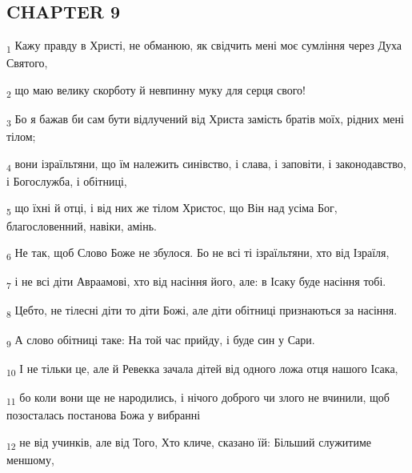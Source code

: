 \subsection{CHAPTER 9}
\begin{tcolorbox}
\textsubscript{1} Кажу правду в Христі, не обманюю, як свідчить мені моє сумління через Духа Святого,
\end{tcolorbox}
\begin{tcolorbox}
\textsubscript{2} що маю велику скорботу й невпинну муку для серця свого!
\end{tcolorbox}
\begin{tcolorbox}
\textsubscript{3} Бо я бажав би сам бути відлучений від Христа замість братів моїх, рідних мені тілом;
\end{tcolorbox}
\begin{tcolorbox}
\textsubscript{4} вони ізраїльтяни, що їм належить синівство, і слава, і заповіти, і законодавство, і Богослужба, і обітниці,
\end{tcolorbox}
\begin{tcolorbox}
\textsubscript{5} що їхні й отці, і від них же тілом Христос, що Він над усіма Бог, благословенний, навіки, амінь.
\end{tcolorbox}
\begin{tcolorbox}
\textsubscript{6} Не так, щоб Слово Боже не збулося. Бо не всі ті ізраїльтяни, хто від Ізраїля,
\end{tcolorbox}
\begin{tcolorbox}
\textsubscript{7} і не всі діти Авраамові, хто від насіння його, але: в Ісаку буде насіння тобі.
\end{tcolorbox}
\begin{tcolorbox}
\textsubscript{8} Цебто, не тілесні діти то діти Божі, але діти обітниці признаються за насіння.
\end{tcolorbox}
\begin{tcolorbox}
\textsubscript{9} А слово обітниці таке: На той час прийду, і буде син у Сари.
\end{tcolorbox}
\begin{tcolorbox}
\textsubscript{10} І не тільки це, але й Ревекка зачала дітей від одного ложа отця нашого Ісака,
\end{tcolorbox}
\begin{tcolorbox}
\textsubscript{11} бо коли вони ще не народились, і нічого доброго чи злого не вчинили, щоб позосталась постанова Божа у вибранні
\end{tcolorbox}
\begin{tcolorbox}
\textsubscript{12} не від учинків, але від Того, Хто кличе, сказано їй: Більший служитиме меншому,
\end{tcolorbox}
